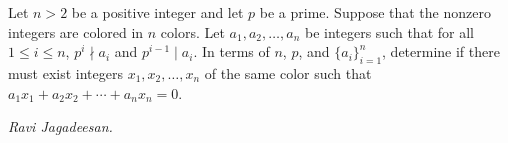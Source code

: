 Let $n>2$ be a positive integer and let $p$ be a prime. Suppose that the nonzero integers are colored in $n$ colors. Let $a_1,a_2,\ldots,a_{n}$ be integers such that for all $1\le i\le n$, $p^i\nmid a_i$ and $p^{i-1}\mid a_i$. In terms of $n$, $p$, and $\{a_i\}_{i=1}^{n}$, determine if there must exist integers $x_1,x_2,\ldots,x_{n}$ of the same color such that $a_1x_1+a_2x_2+\cdots+a_{n}x_{n}=0$.

\textit{Ravi Jagadeesan.}